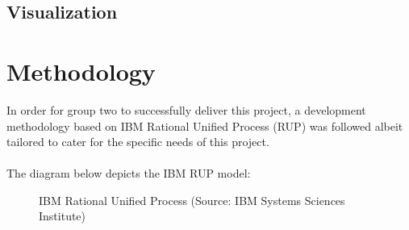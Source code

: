 \documentclass[12pt]{article} %
\begin{document}
	
	
	
	
	
	
	
	\subsection{Visualization}
	

	
	
	\section{Methodology}
	
	
	In order for group two to successfully deliver this project, a development methodology based on IBM Rational Unified Process (RUP) was followed albeit tailored to cater for the specific needs of this project.\\
	\\
	The diagram below depicts the IBM RUP model:
	
		\begin{figure}[H] %
			\caption{IBM Rational Unified Process (Source: IBM Systems Sciences Institute)}
			\label{fig:speciation}
		\end{figure}
		
		
	
	
	
	
	
\end{document}
